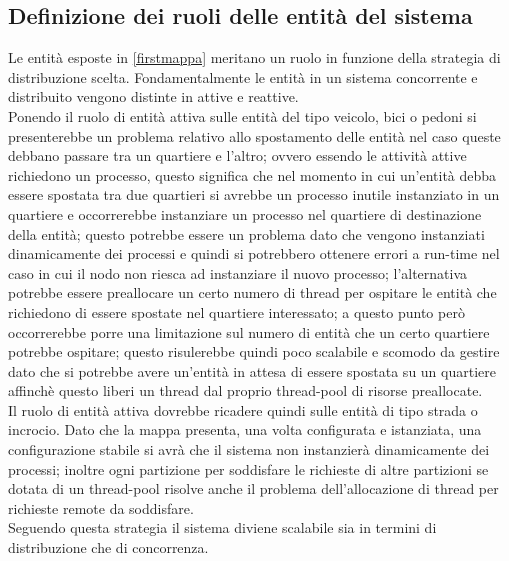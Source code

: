 \subsection{Definizione dei ruoli delle entità del sistema}
Le entità esposte in \ref{firstmappa} meritano un ruolo in funzione della strategia di distribuzione scelta. Fondamentalmente le entità in un sistema concorrente e distribuito vengono distinte in attive e reattive. \\
Ponendo il ruolo di entità attiva sulle entità del tipo veicolo, bici o pedoni si presenterebbe un problema relativo allo spostamento delle entità nel caso queste debbano passare tra un quartiere e l'altro; ovvero essendo le attività attive richiedono un processo, questo significa che nel momento in cui un'entità debba essere spostata tra due quartieri si avrebbe un processo inutile instanziato in un quartiere e occorrerebbe instanziare un processo nel quartiere di destinazione della entità; questo potrebbe essere un problema dato che vengono instanziati dinamicamente dei processi e quindi si potrebbero ottenere errori a run-time nel caso in cui il nodo non riesca ad instanziare il nuovo processo; l'alternativa potrebbe essere preallocare un certo numero di thread per ospitare le entità che richiedono di essere spostate nel quartiere interessato; a questo punto però occorrerebbe porre una limitazione sul numero di entità che un certo quartiere potrebbe ospitare; questo risulerebbe quindi poco scalabile e scomodo da gestire dato che si potrebbe avere un'entità in attesa di essere spostata su un quartiere affinchè questo liberi un thread dal proprio thread-pool di risorse preallocate. \\
Il ruolo di entità attiva dovrebbe ricadere quindi sulle entità di tipo strada o incrocio. Dato che la mappa presenta, una volta configurata e istanziata, una configurazione stabile si avrà che il sistema non instanzierà dinamicamente dei processi; inoltre ogni partizione per soddisfare le richieste di altre partizioni se dotata di un thread-pool risolve anche il problema dell'allocazione di thread per richieste remote da soddisfare.\\
Seguendo questa strategia il sistema diviene scalabile sia in termini di distribuzione che di concorrenza.

